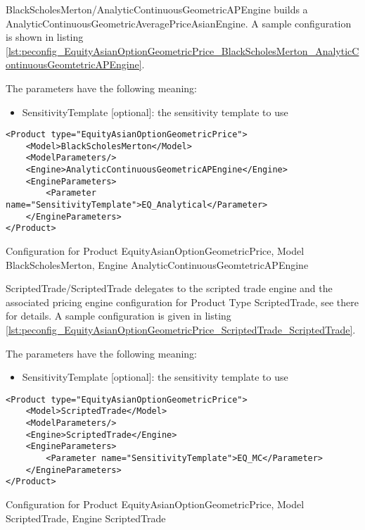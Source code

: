 BlackScholesMerton/AnalyticContinuousGeometricAPEngine builds a AnalyticContinuousGeometricAveragePriceAsianEngine. A sample
configuration is shown in listing
\ref{lst:peconfig_EquityAsianOptionGeometricPrice_BlackScholesMerton_AnalyticContinuousGeomtetricAPEngine}.

The parameters have the following meaning:

\begin{itemize}
\item SensitivityTemplate [optional]: the sensitivity template to use 
\end{itemize}

\begin{longlisting}
\begin{verbatim}
<Product type="EquityAsianOptionGeometricPrice">
    <Model>BlackScholesMerton</Model>
    <ModelParameters/>
    <Engine>AnalyticContinuousGeometricAPEngine</Engine>
    <EngineParameters>
        <Parameter name="SensitivityTemplate">EQ_Analytical</Parameter>
    </EngineParameters>
</Product>
\end{verbatim}
\caption{Configuration for Product EquityAsianOptionGeometricPrice, Model BlackScholesMerton, Engine AnalyticContinuousGeomtetricAPEngine}
\label{lst:peconfig_EquityAsianOptionGeometricPrice_BlackScholesMerton_AnalyticContinuousGeomtetricAPEngine}
\end{longlisting}

ScriptedTrade/ScriptedTrade delegates to the scripted trade engine and the associated pricing engine configuration for
Product Type ScriptedTrade, see there for details. A sample configuration is given in listing
\ref{lst:peconfig_EquityAsianOptionGeometricPrice_ScriptedTrade_ScriptedTrade}.

The parameters have the following meaning:

\begin{itemize}
\item SensitivityTemplate [optional]: the sensitivity template to use 
\end{itemize}

\begin{longlisting}
\begin{verbatim}
<Product type="EquityAsianOptionGeometricPrice">
    <Model>ScriptedTrade</Model>
    <ModelParameters/>
    <Engine>ScriptedTrade</Engine>
    <EngineParameters>
        <Parameter name="SensitivityTemplate">EQ_MC</Parameter>
    </EngineParameters>
</Product>
\end{verbatim}
\caption{Configuration for Product EquityAsianOptionGeometricPrice, Model ScriptedTrade, Engine ScriptedTrade}
\label{lst:peconfig_EquityAsianOptionGeometricPrice_ScriptedTrade_ScriptedTrade}
\end{longlisting}

